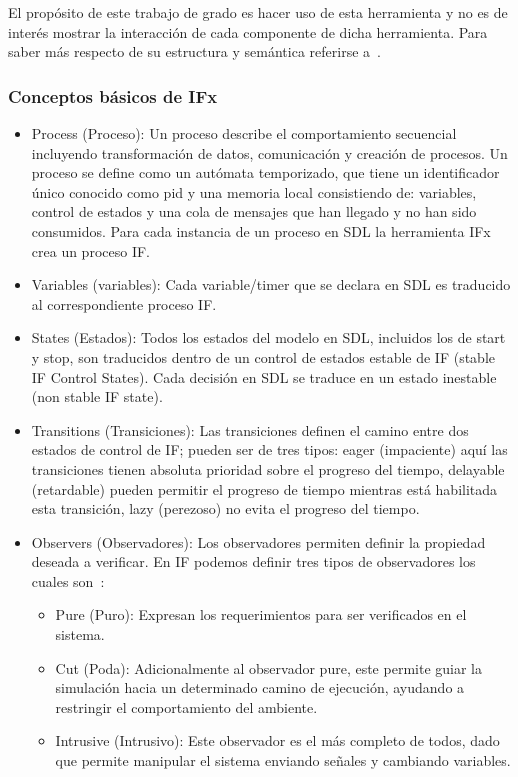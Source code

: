 El prop\'osito de este trabajo de grado es hacer uso de esta herramienta y no es 
de inter\'es mostrar la interacci\'on de cada componente de dicha herramienta. 
Para saber m\'as respecto de su estructura y sem\'antica referirse 
a~\cite{Bozga2004}.

\subsubsection{Conceptos b\'asicos de IFx}

\begin{itemize}
 \item Process (Proceso): Un proceso describe el comportamiento secuencial 
incluyendo transformaci\'on de datos, comunicaci\'on y creaci\'on de procesos. 
Un proceso se define como un aut\'omata temporizado, que tiene un identificador 
\'unico conocido como pid y una memoria local consistiendo de: variables, 
control de estados y una cola de mensajes que han llegado y no han sido 
consumidos. Para cada instancia de un proceso en SDL la herramienta IFx crea un 
proceso IF.
\item Variables (variables): Cada variable/timer que se declara en SDL es 
traducido al correspondiente proceso IF.
\item States (Estados): Todos los estados del modelo en SDL, incluidos los de 
start y stop, son traducidos dentro de un control de estados estable de IF 
(stable IF Control States). Cada decisi\'on en SDL se traduce en un estado 
inestable (non stable IF state).
\item Transitions (Transiciones): Las transiciones definen el camino entre dos 
estados de control de IF; pueden ser de tres tipos: eager (impaciente) aqu\'i 
las transiciones tienen absoluta prioridad sobre el progreso del tiempo, 
delayable (retardable) pueden permitir el progreso de tiempo mientras est\'a 
habilitada esta transici\'on, lazy (perezoso) no evita el progreso del tiempo.
 \item Observers (Observadores): Los observadores permiten definir la propiedad 
deseada a verificar. En IF podemos definir tres tipos de observadores los cuales 
son~\cite{Bozga2004}:
\begin{itemize}
	\item Pure (Puro): Expresan los requerimientos para ser verificados en el 
sistema.
	\item Cut (Poda): Adicionalmente al observador pure, este permite guiar la 
	simulaci\'on hacia un determinado camino de ejecuci\'on, ayudando a restringir 
	el comportamiento del ambiente.
	\item Intrusive (Intrusivo): Este observador es el m\'as completo de todos, 
	dado que permite manipular el sistema enviando se\~nales y cambiando variables.
\end{itemize}
\end{itemize}

